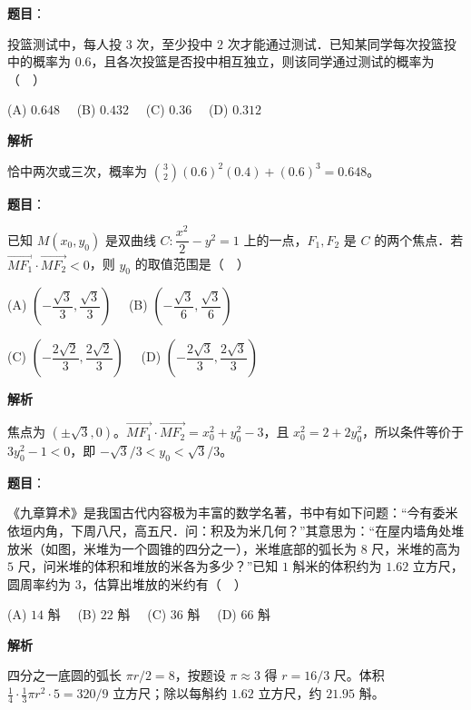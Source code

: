 \begin{answer}

\textbf{题目}：

投篮测试中，每人投 $3$ 次，至少投中 $2$ 次才能通过测试．已知某同学每次投篮投中的概率为 $0.6$，且各次投篮是否投中相互独立，则该同学通过测试的概率为（　）

(A) $0.648$　 (B) $0.432$　 (C) $0.36$　 (D) $0.312$

\textbf{解析}

恰中两次或三次，概率为 $\binom32(0.6)^2(0.4)+(0.6)^3=0.648$。


\end{answer}
\begin{answer}

\textbf{题目}：

已知 $M(x_0,y_0)$ 是双曲线 $C:\dfrac{x^2}{2}-y^2=1$ 上的一点，$F_1,F_2$ 是 $C$ 的两个焦点．若 $\overrightarrow{MF_1}\cdot\overrightarrow{MF_2}<0$，则 $y_0$ 的取值范围是（　）

(A) $\left(-\dfrac{\sqrt3}{3},\dfrac{\sqrt3}{3}\right)$　 (B) $\left(-\dfrac{\sqrt3}{6},\dfrac{\sqrt3}{6}\right)$

(C) $\left(-\dfrac{2\sqrt2}{3},\dfrac{2\sqrt2}{3}\right)$　 (D) $\left(-\dfrac{2\sqrt3}{3},\dfrac{2\sqrt3}{3}\right)$

\textbf{解析}

焦点为 $(\pm\sqrt3,0)$。$\overrightarrow{MF_1}\cdot\overrightarrow{MF_2}=x_0^2+y_0^2-3$，且 $x_0^2=2+2y_0^2$，所以条件等价于 $3y_0^2-1<0$，即 $-\sqrt3/3<y_0<\sqrt3/3$。


\end{answer}
\begin{answer}

\textbf{题目}：

《九章算术》是我国古代内容极为丰富的数学名著，书中有如下问题：“今有委米依垣内角，下周八尺，高五尺．问：积及为米几何？”其意思为：“在屋内墙角处堆放米（如图，米堆为一个圆锥的四分之一），米堆底部的弧长为 $8$ 尺，米堆的高为 $5$ 尺，问米堆的体积和堆放的米各为多少？”已知 $1$ 斛米的体积约为 $1.62$ 立方尺，圆周率约为 $3$，估算出堆放的米约有（　）
\nopagebreak[4]
\begin{center}\end{center}
\nopagebreak[4]
(A) $14$ 斛　 (B) $22$ 斛　 (C) $36$ 斛　 (D) $66$ 斛

\textbf{解析}

四分之一底圆的弧长 $\pi r/2=8$，按题设 $\pi\approx3$ 得 $r=16/3$ 尺。体积 $\tfrac14\cdot\tfrac13\pi r^2\cdot5=320/9$ 立方尺；除以每斛约 $1.62$ 立方尺，约 $21.95$ 斛。


\end{answer}
